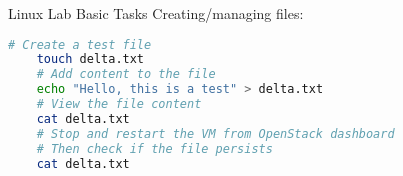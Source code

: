 \begin{example2}{Linux Lab Basic Tasks}
    Creating/managing files:
    \begin{lstlisting}[language=bash, style=basesmol]
    # Create a test file
    touch delta.txt
    # Add content to the file
    echo "Hello, this is a test" > delta.txt
    # View the file content
    cat delta.txt
    # Stop and restart the VM from OpenStack dashboard
    # Then check if the file persists
    cat delta.txt
    \end{lstlisting}
\end{example2}

\multend